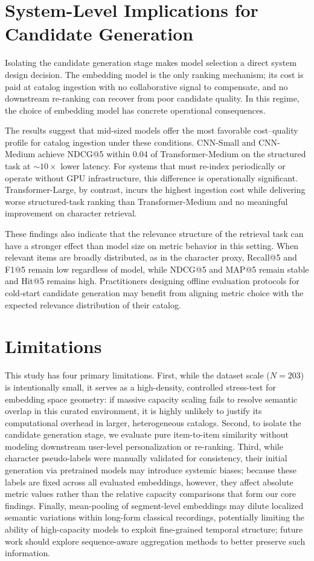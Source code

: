 \documentclass{CPP}
\begin{document}
\section{System-Level Implications for Candidate Generation}

Isolating the candidate generation stage makes model selection a direct system design decision. The embedding model is the only ranking mechanism; its cost is paid at catalog ingestion with no collaborative signal to compensate, and no downstream re-ranking can recover from poor candidate quality. In this regime, the choice of embedding model has concrete operational consequences.

The results suggest that mid-sized models offer the most favorable cost--quality profile for catalog ingestion under these conditions. CNN-Small and CNN-Medium achieve NDCG@5 within 0.04 of Transformer-Medium on the structured task at ${\sim}10{\times}$ lower latency. For systems that must re-index periodically or operate without GPU infrastructure, this difference is operationally significant. Transformer-Large, by contrast, incurs the highest ingestion cost while delivering worse structured-task ranking than Transformer-Medium and no meaningful improvement on character retrieval.

These findings also indicate that the relevance structure of the retrieval task can have a stronger effect than model size on metric behavior in this setting. When relevant items are broadly distributed, as in the character proxy, Recall@5 and F1@5 remain low regardless of model, while NDCG@5 and MAP@5 remain stable and Hit@5 remains high. Practitioners designing offline evaluation protocols for cold-start candidate generation may benefit from aligning metric choice with the expected relevance distribution of their catalog.

\section{Limitations}

This study has four primary limitations. First, while the dataset scale ($N{=}203$) is intentionally small, it serves as a high-density, controlled stress-test for embedding space geometry: if massive capacity scaling fails to resolve semantic overlap in this curated environment, it is highly unlikely to justify its computational overhead in larger, heterogeneous catalogs. Second, to isolate the candidate generation stage, we evaluate pure item-to-item similarity without modeling downstream user-level personalization or re-ranking. Third, while character pseudo-labels were manually validated for consistency, their initial generation via pretrained models may introduce systemic biases; because these labels are fixed across all evaluated embeddings, however, they affect absolute metric values rather than the relative capacity comparisons that form our core findings. Finally, mean-pooling of segment-level embeddings may dilute localized semantic variations within long-form classical recordings, potentially limiting the ability of high-capacity models to exploit fine-grained temporal structure; future work should explore sequence-aware aggregation methods to better preserve such information.
\end{document}
